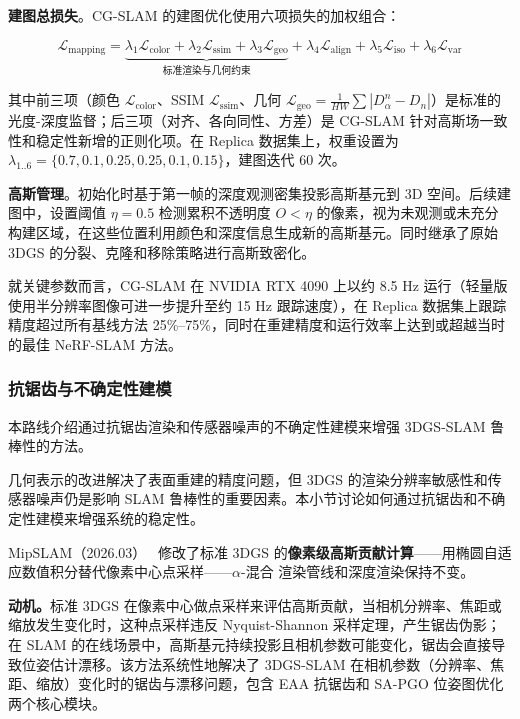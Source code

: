 \textbf{建图总损失}。CG-SLAM 的建图优化使用六项损失的加权组合：

\begin{equation}
    \mathcal{L}_\text{mapping} = \underbrace{\lambda_1 \mathcal{L}_\text{color} + \lambda_2 \mathcal{L}_\text{ssim} + \lambda_3 \mathcal{L}_\text{geo}}_{\text{标准渲染与几何约束}} + \lambda_4 \mathcal{L}_\text{align} + \lambda_5 \mathcal{L}_\text{iso} + \lambda_6 \mathcal{L}_\text{var}
\end{equation}

其中前三项（颜色 $\mathcal{L}_\text{color}$、SSIM $\mathcal{L}_\text{ssim}$、几何 $\mathcal{L}_\text{geo} = \frac{1}{HW}\sum|D_\alpha^n - D_n|$）是标准的光度-深度监督；后三项（对齐、各向同性、方差）是 CG-SLAM 针对高斯场一致性和稳定性新增的正则化项。在 Replica 数据集上，权重设置为 $\lambda_{1..6} = \{0.7, 0.1, 0.25, 0.25, 0.1, 0.15\}$，建图迭代 60 次。

\textbf{高斯管理}。初始化时基于第一帧的深度观测密集投影高斯基元到 3D 空间。后续建图中，设置阈值 $\eta=0.5$ 检测累积不透明度 $O < \eta$ 的像素，视为未观测或未充分构建区域，在这些位置利用颜色和深度信息生成新的高斯基元。同时继承了原始 3DGS 的分裂、克隆和移除策略进行高斯致密化。

就关键参数而言，CG-SLAM 在 NVIDIA RTX 4090 上以约 8.5 Hz 运行（轻量版使用半分辨率图像可进一步提升至约 15 Hz 跟踪速度），在 Replica 数据集上跟踪精度超过所有基线方法 25\%--75\%，同时在重建精度和运行效率上达到或超越当时的最佳 NeRF-SLAM 方法。

\subsubsection{抗锯齿与不确定性建模}

本路线介绍通过抗锯齿渲染和传感器噪声的不确定性建模来增强 3DGS-SLAM 鲁棒性的方法。

几何表示的改进解决了表面重建的精度问题，但 3DGS 的渲染分辨率敏感性和传感器噪声仍是影响 SLAM 鲁棒性的重要因素。本小节讨论如何通过抗锯齿和不确定性建模来增强系统的稳定性。

MipSLAM（2026.03）~\cite{2603_06989} 修改了标准 3DGS 的\textbf{像素级高斯贡献计算}——用椭圆自适应数值积分替代像素中心点采样——$\alpha$-混合 渲染管线和深度渲染保持不变。

\textbf{动机。}标准 3DGS 在像素中心做点采样来评估高斯贡献，当相机分辨率、焦距或缩放发生变化时，这种点采样违反 Nyquist-Shannon 采样定理，产生锯齿伪影；在 SLAM 的在线场景中，高斯基元持续投影且相机参数可能变化，锯齿会直接导致位姿估计漂移。该方法系统性地解决了 3DGS-SLAM 在相机参数（分辨率、焦距、缩放）变化时的锯齿与漂移问题，包含 EAA 抗锯齿和 SA-PGO 位姿图优化两个核心模块。

